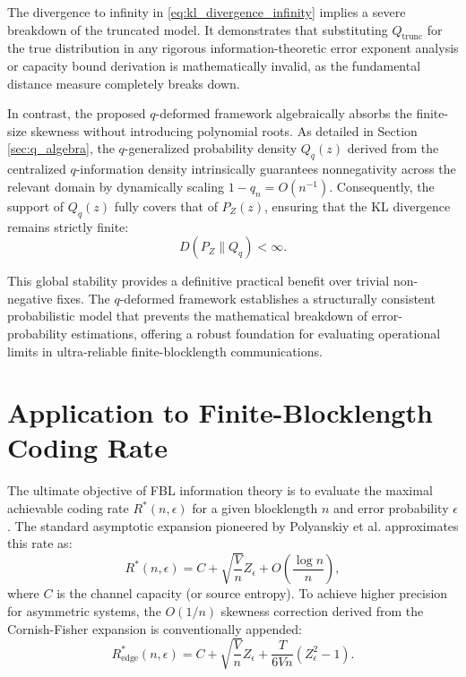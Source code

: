 \documentclass[conference]{IEEEtran}
\begin{document}
The divergence to infinity in \eqref{eq:kl_divergence_infinity} implies a severe breakdown of the truncated model. It demonstrates that substituting $Q_{\text{trunc}}$ for the true distribution in any rigorous information-theoretic error exponent analysis or capacity bound derivation is mathematically invalid, as the fundamental distance measure completely breaks down.

In contrast, the proposed $q$-deformed framework algebraically absorbs the finite-size skewness without introducing polynomial roots. As detailed in Section \ref{sec:q_algebra}, the $q$-generalized probability density $Q_q(z)$ derived from the centralized $q$-information density intrinsically guarantees nonnegativity across the relevant domain by dynamically scaling $1-q_n = O(n^{-1})$. Consequently, the support of $Q_q(z)$ fully covers that of $P_Z(z)$, ensuring that the KL divergence remains strictly finite:
\begin{equation}
    D(P_Z \parallel Q_q) < \infty.
\end{equation}

This global stability provides a definitive practical benefit over trivial non-negative fixes. The $q$-deformed framework establishes a structurally consistent probabilistic model that prevents the mathematical breakdown of error-probability estimations, offering a robust foundation for evaluating operational limits in ultra-reliable finite-blocklength communications.

\section{Application to Finite-Blocklength Coding Rate}
\label{sec:coding_rate}

The ultimate objective of FBL information theory is to evaluate the maximal achievable coding rate $R^*(n, \epsilon)$ for a given blocklength $n$ and error probability $\epsilon$. The standard asymptotic expansion pioneered by Polyanskiy et al. \cite{Polyanskiy2010} approximates this rate as:
\begin{equation}
    R^*(n, \epsilon) = C + \sqrt{\frac{V}{n}} Z_\epsilon + O\left(\frac{\log n}{n}\right),
    \label{eq:polyanskiy_rate}
\end{equation}
where $C$ is the channel capacity (or source entropy). To achieve higher precision for asymmetric systems, the $O(1/n)$ skewness correction derived from the Cornish-Fisher expansion is conventionally appended:
\begin{equation}
    R_{\text{edge}}^*(n, \epsilon) = C + \sqrt{\frac{V}{n}} Z_\epsilon + \frac{T}{6V n}(Z_\epsilon^2 - 1).
    \label{eq:rate_with_skewness}
\end{equation}
\end{document}
